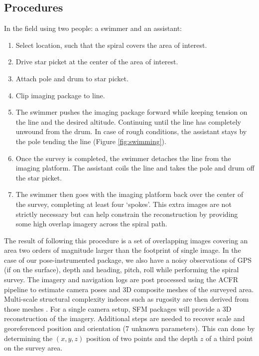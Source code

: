 \subsection{Procedures}

In the field using two people: a swimmer and an assistant:\begin{enumerate}
\item Select location, such that the spiral covers the area of interest.
\item Drive star picket at the center of the area of interest. 
\item Attach pole and drum to star picket.
\item Clip imaging package to line.
\item The swimmer pushes the imaging package forward while keeping tension on the line and the desired altitude. Continuing until the line has completely unwound from the drum. In case of rough conditions, the assistant stays by the pole tending the line (Figure \ref{fig:swimming}).
\item Once the survey is completed, the swimmer detaches the line from the imaging platform. The assistant coils the line and takes the pole and drum off the star picket. 
\item The swimmer then goes with the imaging platform back over the center of the survey, completing at least four `spokes'. This extra images are not strictly necessary but can help constrain the reconstruction by providing some high overlap imagery across the spiral path.
\end{enumerate}

The result of following this procedure is a set of overlapping images covering an area two orders of magnitude larger than the footprint of single image. In the case of our pose-instrumented package, we also have a noisy observations of GPS (if on the surface), depth and heading, pitch, roll while performing the spiral survey. The imagery and navigation logs are post processed using the ACFR pipeline \cite{Johnson_Roberson_2010} \cite{Mahon_2008} \cite{Johnson_Roberson_2013} to estimate camera poses and 3D composite meshes of the surveyed area. Multi-scale structural complexity indeces such as rugosity are then derived from those meshes \cite{Friedman_2012}.
For a single camera setup, SFM packages will provide a 3D reconstruction of the imagery. Additional steps are needed to recover scale and georeferenced position and orientation (7 unknown parameters). This can done by determining the $(x,y,z)$ position of two points and the depth $z$ of a third point on the survey area.
